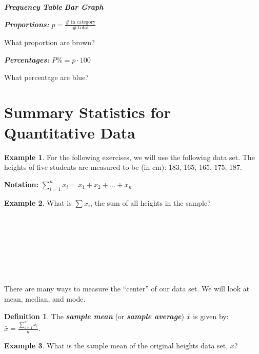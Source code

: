 \documentclass[
  11pt,
  oneside]{book}
\theoremstyle{definition}
\newtheorem{definition}{Definition}[chapter]
\theoremstyle{definition}
\newtheorem{example}{Example}[chapter]
\theoremstyle{definition}
\theoremstyle{definition}
\theoremstyle{remark}
\begin{document}
\bigskip

\textbf{\emph{Frequency Table}} \hfill 
\textbf{\emph{Bar Graph}} \hfill
\hfill

\vfill
\vfill
\vfill

\textbf{\emph{Proportions:}} \(p=\frac{\#\text{ in category}}{\#\text{ total}}\)

\indent What proportion are brown?

\vfill

\textbf{\emph{Percentages:}} \(P\% = p \cdot 100\)

What percentage are blue?
\vfill

\newpage

\section{Summary Statistics for Quantitative Data}\label{summary-statistics-for-quantitative-data}

\begin{example}
For the following exercises, we will use the following data set. The heights of five students are measured to be (in cm): 183, 165, 165, 175, 187.
\end{example}

\textbf{Notation:} \(\sum_{i=1}^n x_i = x_1 + x_2 + ... + x_n\)

\begin{example}
What is \(\sum x_i\), the sum of all heights in the sample?
\end{example}

\(~\)

\(~\)

\(~\)

\(~\)

There are many ways to measure the ``center'' of our data set. We will look at mean, median, and mode.

\begin{definition}
The \textbf{\emph{sample mean}} (or \textbf{\emph{sample average}}) \(\bar{x}\) is given by: \(\bar{x} = \frac{\sum_{i=1}^n x_i}{n}\).
\end{definition}

\begin{example}
What is the sample mean of the original heights data set, \(\bar{x}\)?
\end{example}

\(~\)

\(~\)

\(~\)

\(~\)
\end{document}
